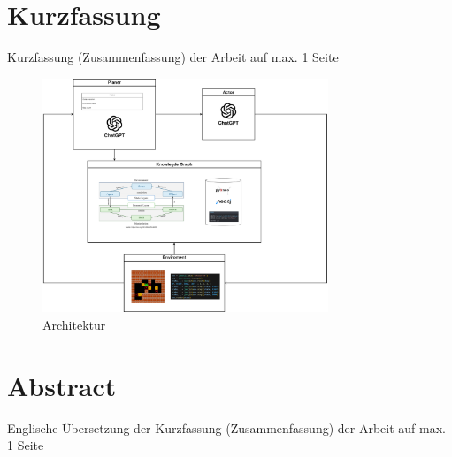 \thispagestyle{empty}

\section*{Kurzfassung}
\label{sec:kurzfassung}

Kurzfassung (Zusammenfassung) der Arbeit auf max. 1 Seite

\begin{figure}[!h]
	\centering
	\includegraphics[height=7.0cm]{images/CodeGenKgArchitecture.png}
		\caption[Architektur]{Architektur}
	\label{Fig:CodeGenKgArchitecture}
\end{figure}

\newpage
\thispagestyle{empty}
\section*{Abstract}
\label{sec:abstract}

Englische Übersetzung der Kurzfassung (Zusammenfassung) der Arbeit auf max. 1 Seite